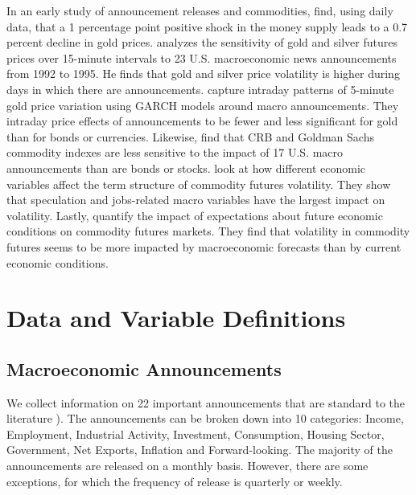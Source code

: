\documentclass[12pt]{article}
\begin{document}
In an early study of announcement releases and commodities, \citet{frankel1985commodity}  find, using daily data, that a 1 percentage point positive shock in the money supply leads to a 0.7 percent decline in gold prices. \citet{christie2000macroeconomics} analyzes the sensitivity of gold and silver futures prices over 15-minute intervals to 23 U.S. macroeconomic news announcements from 1992 to 1995. He finds that gold and silver price volatility is higher during days in which there are announcements. \citet{cai2001moves} capture intraday patterns of 5-minute gold price variation using GARCH models around macro announcements. They intraday price effects of announcements to be fewer and less significant for gold than for bonds or currencies.  Likewise, \citet{hess2008commodity} find that CRB and Goldman Sachs commodity indexes are less sensitive to the impact of 17 U.S. macro announcements than are bonds or stocks.
 \citet{hollstein2020volatility} look at how different economic variables affect the term structure of commodity futures volatility. They show that speculation and jobs-related macro variables have the largest impact on volatility. Lastly, \citet{ye2021macroeconomic} quantify the impact of expectations about future economic conditions on commodity futures markets. They find that volatility in commodity futures seems to be more impacted by macroeconomic forecasts than by current economic conditions. 



\section{Data and Variable Definitions}


\subsection{Macroeconomic Announcements}
 
We collect information on 22 important announcements that are standard to the literature   \citep[see e.g.][]{kurov2019price}). The announcements can be broken down into 10 categories: Income, Employment, Industrial Activity, Investment, Consumption, Housing Sector, Government, Net Exports, Inflation and Forward-looking. The majority of the announcements are released on a monthly basis. However, there are some exceptions, for which the frequency of release is quarterly or weekly. 
\end{document}
